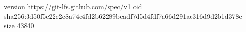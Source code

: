 version https://git-lfs.github.com/spec/v1
oid sha256:3d50f5c22c2c8a74c4fd2b62289bcadf7d5d4fdf7a66d291ae316d9d2b1d378e
size 43840
